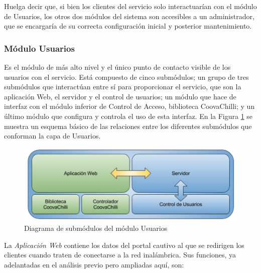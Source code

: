 Huelga decir que, si bien los clientes del servicio solo interactuarían con el módulo de Usuarios, los otros dos módulos del sistema son accesibles a un administrador, que se encargaría de su correcta configuración inicial y posterior mantenimiento.

\subsubsection{Módulo Usuarios}
Es el módulo de más alto nivel y el único punto de contacto visible de los usuarios con el servicio. Está compuesto de cinco submódulos; un grupo de tres submódulos que interactúan entre sí para proporcionar el servicio, que son la aplicación Web, el servidor y el control de usuarios; un módulo que hace de interfaz con el módulo inferior de Control de Acceso, biblioteca CoovaChilli; y un último módulo que configura y controla el uso de esta interfaz. En la Figura \ref{moduloUsers} se muestra un esquema básico de las relaciones entre los diferentes submódulos que conforman la capa de Usuarios.

\begin{figure}[!t]
\begin{center}
\includegraphics[width=0.75\linewidth]{./4_AnalisisFuncional/Img/moduloUsers.png}
\end{center}
\caption{Diagrama de submódulos del módulo Usuarios}
\label{moduloUsers}
\end{figure}

La \emph{Aplicación Web} contiene los datos del portal cautivo al que se redirigen los clientes cuando traten de conectarse a la red inalámbrica. Sus funciones, ya adelantadas en el análisis previo pero ampliadas aquí, son:

